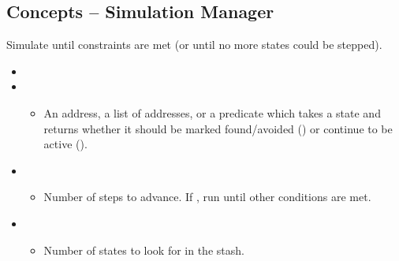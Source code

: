 \documentclass[xcolor={dvipsnames}]{beamer}
\begin{document}
\subsection{Concepts -- Simulation Manager}
\begin{frame}[fragile]{}
    Simulate until constraints are met (or until no more states could be stepped).
    \begin{itemize}
        \item<2-> 
        \item<2-> 
              \begin{itemize}
                  \item An address, a list of addresses, or a predicate which takes a state and returns whether it should be marked found/avoided () or continue to be active ().
              \end{itemize}
        \item<3-> 
              \begin{itemize}
                  \item Number of steps to advance. If , run until other conditions are met.
              \end{itemize}
        \item<3-> 
              \begin{itemize}
                  \item Number of states to look for in the  stash.
              \end{itemize}
    \end{itemize}
\end{frame}
\end{document}
